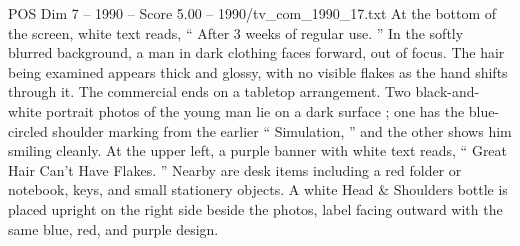\begin{textsample}{POS Dim 7 – 1990 – Score 5.00 – 1990/tv\_com\_1990\_17.txt}
At the bottom of the screen, white text reads, “ After 3 weeks of regular use. ” In the softly blurred background, a man in dark clothing faces forward, out of focus.
The hair being examined appears thick and glossy, with no visible flakes as the hand shifts through it.
The commercial ends on a tabletop arrangement.
Two black-and-white portrait photos of the young man lie on a dark surface ; one has the blue-circled shoulder marking from the earlier “ Simulation, ” and the other shows him smiling cleanly.
At the upper left, a purple banner with white text reads, “ Great Hair Can't Have Flakes. ” Nearby are desk items including a red folder or notebook, keys, and small stationery objects.
A white Head \& Shoulders bottle is placed upright on the right side beside the photos, label facing outward with the same blue, red, and purple design.

\end{textsample}
